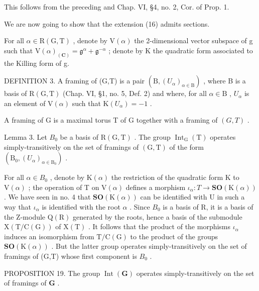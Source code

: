 This follows from the preceding and Chap. VI, §4, no. 2, Cor. of Prop. 1.

We are now going to show that the extension (16) admits sections.

For all \(\alpha\in\mathrm{R}(\mathrm{G},\mathrm{T})\) , denote by \(\mathrm{V}(\alpha)\) the 2-dimensional vector subspace of g such that \(\mathrm{V}(\alpha)_{(\mathbf{C})}=\mathfrak{g}^{\alpha}+\mathfrak{g}^{-\alpha}\) ; denote by K the quadratic form associated to the Killing form of g.

DEFINITION 3. A framing of (G,T) is a pair \((\mathrm{B},(U_{\alpha})_{\alpha \in \mathrm{B}})\) , where B is a basis of \(\mathrm{R}(\mathrm{G},\mathrm{T})\) (Chap. VI, §1, no. 5, Def. 2) and where, for all \(\alpha \in \mathrm{B}\) , \(U_{\alpha}\) is an element of \(\mathrm{V}(\alpha)\) such that \(\mathrm{K}(U_{\alpha}) = -1\) .

A framing of G is a maximal torus T of G together with a framing of \((G, T)\) .

Lemma 3. Let \(B_{0}\) be a basis of \(\mathrm{R}(\mathrm{G},\mathrm{T})\) . The group \(\operatorname{Int}_{\mathrm{G}}(\mathrm{T})\) operates simply-transitively on the set of framings of \((\mathrm{G},\mathrm{T})\) of the form \((\mathrm{B}_{0},(U_{\alpha})_{\alpha\in\mathrm{B}_{0}})\) .

For all \(\alpha\in B_{0}\) , denote by \(\mathrm{K}(\alpha)\) the restriction of the quadratic form K to \(\mathrm{V}(\alpha)\) ; the operation of T on \(\mathrm{V}(\alpha)\) defines a morphism \(\iota_{\alpha}:T\to\mathbf{SO}(\mathrm{K}(\alpha))\) . We have seen in no. 4 that \(\mathbf{SO}(\mathrm{K}(\alpha))\) can be identified with U in such a way that \(\iota_{\alpha}\) is identified with the root \(\alpha\) . Since \(B_{0}\) is a basis of R, it is a basis of the Z-module \(\mathrm{Q}(\mathrm{R})\) generated by the roots, hence a basis of the submodule \(\mathrm{X}(\mathrm{T}/\mathrm{C}(\mathrm{G}))\) of \(\mathrm{X}(\mathrm{T})\) . It follows that the product of the morphisms \(\iota_{\alpha}\) induces an isomorphism from \(\mathrm{T}/\mathrm{C}(\mathrm{G})\) to the product of the groups \(\mathbf{SO}(\mathrm{K}(\alpha))\) . But the latter group operates simply-transitively on the set of framings of (G,T) whose first component is \(B_{0}\) .

PROPOSITION 19. The group \(\operatorname{Int}(\mathbf{G})\) operates simply-transitively on the set of framings of \(\mathbf{G}\) .

